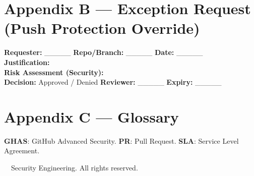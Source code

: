 \documentclass[11pt,a4paper]{article}
\begin{document}
\section*{Appendix B --- Exception Request (Push Protection Override)}
\begin{warnbox}
\textbf{Requester:} \_\_\_\_\_ \quad \textbf{Repo/Branch:} \_\_\_\_\_ \quad \textbf{Date:} \_\_\_\_\_\\[2mm]
\textbf{Justification:} \hrulefill\\[3mm]
\textbf{Risk Assessment (Security):} \hrulefill\\[3mm]
\textbf{Decision:} Approved / Denied \quad \textbf{Reviewer:} \_\_\_\_\_ \quad \textbf{Expiry:} \_\_\_\_\_
\end{warnbox}

\section*{Appendix C --- Glossary}
\textbf{GHAS}: GitHub Advanced Security. \quad
\textbf{PR}: Pull Request. \quad
\textbf{SLA}: Service Level Agreement.

\vfill
\begin{center}
{\small \textcopyright\ \the\year\ Security Engineering. All rights reserved.}
\end{center}
\end{document}
